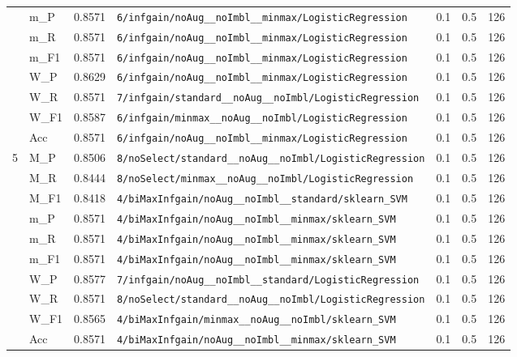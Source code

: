 \begin{table}[htbp]
\begin{tabular}{|c|l|c|>{\ttfamily\footnotesize}p{7.2cm}|c|c|c|}
 & m\_P & 0.8571 & \texttt{6/infgain/noAug\_\_noImbl\_\_minmax/LogisticRegression} & 0.1 & 0.5  & 126 \\ 
 & m\_R & 0.8571 & \texttt{6/infgain/noAug\_\_noImbl\_\_minmax/LogisticRegression} & 0.1 & 0.5  & 126 \\ 
 & m\_F1 & 0.8571 & \texttt{6/infgain/noAug\_\_noImbl\_\_minmax/LogisticRegression} & 0.1 & 0.5  & 126 \\ 
 & W\_P & 0.8629 & \texttt{6/infgain/noAug\_\_noImbl\_\_minmax/LogisticRegression} & 0.1 & 0.5  & 126 \\ 
 & W\_R & 0.8571 & \texttt{7/infgain/standard\_\_noAug\_\_noImbl/LogisticRegression} & 0.1 & 0.5  & 126 \\ 
 & W\_F1 & 0.8587 & \texttt{6/infgain/minmax\_\_noAug\_\_noImbl/LogisticRegression} & 0.1 & 0.5  & 126 \\ 
 & Acc & 0.8571 & \texttt{6/infgain/noAug\_\_noImbl\_\_minmax/LogisticRegression} & 0.1 & 0.5  & 126 \\ 
\hline
\multirow{10}{*}{5} & M\_P & 0.8506 & \texttt{8/noSelect/standard\_\_noAug\_\_noImbl/LogisticRegression} & 0.1 & 0.5  & 126 \\ 
 & M\_R & 0.8444 & \texttt{8/noSelect/minmax\_\_noAug\_\_noImbl/LogisticRegression} & 0.1 & 0.5  & 126 \\ 
 & M\_F1 & 0.8418 & \texttt{4/biMaxInfgain/noAug\_\_noImbl\_\_standard/sklearn\_SVM} & 0.1 & 0.5  & 126 \\ 
 & m\_P & 0.8571 & \texttt{4/biMaxInfgain/noAug\_\_noImbl\_\_minmax/sklearn\_SVM} & 0.1 & 0.5  & 126 \\ 
 & m\_R & 0.8571 & \texttt{4/biMaxInfgain/noAug\_\_noImbl\_\_minmax/sklearn\_SVM} & 0.1 & 0.5  & 126 \\ 
 & m\_F1 & 0.8571 & \texttt{4/biMaxInfgain/noAug\_\_noImbl\_\_minmax/sklearn\_SVM} & 0.1 & 0.5  & 126 \\ 
 & W\_P & 0.8577 & \texttt{7/infgain/noAug\_\_noImbl\_\_standard/LogisticRegression} & 0.1 & 0.5  & 126 \\ 
 & W\_R & 0.8571 & \texttt{8/noSelect/standard\_\_noAug\_\_noImbl/LogisticRegression} & 0.1 & 0.5  & 126 \\ 
 & W\_F1 & 0.8565 & \texttt{4/biMaxInfgain/minmax\_\_noAug\_\_noImbl/sklearn\_SVM} & 0.1 & 0.5  & 126 \\ 
 & Acc & 0.8571 & \texttt{4/biMaxInfgain/noAug\_\_noImbl\_\_minmax/sklearn\_SVM} & 0.1 & 0.5  & 126 \\ 
\hline
\end{tabular}
\end{table}